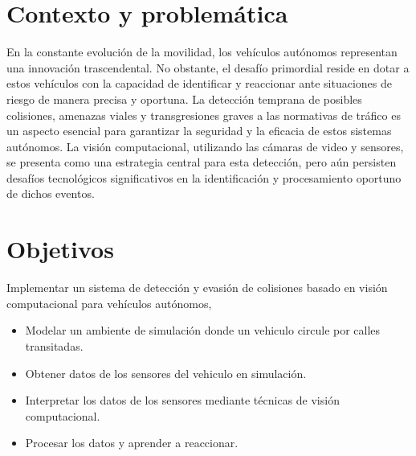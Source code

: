 \documentclass[10pt,letterpaper,final]{article}
\begin{document}
    \section*{Contexto y problemática}
    \noindent En la constante evolución de la movilidad, los vehículos autónomos representan una innovación trascendental.
    No obstante, el desafío primordial reside en dotar a estos vehículos con la capacidad de identificar y reaccionar ante situaciones de riesgo
    de manera precisa y oportuna. La detección temprana de posibles colisiones, amenazas viales y transgresiones graves a las normativas de tráfico
    es un aspecto esencial para garantizar la seguridad y la eficacia de estos sistemas autónomos. La visión computacional,
    utilizando las cámaras de video y sensores, se presenta como una estrategia central para esta detección,
    pero aún persisten desafíos tecnológicos significativos en la identificación y procesamiento oportuno de dichos eventos.
    \section*{Objetivos}
    \newline
    \noindent Implementar un sistema de detección y evasión de colisiones basado en visión computacional para vehículos autónomos,
    \newline
    \newline
    \begin{itemize}
        \item Modelar un ambiente de simulación donde un vehiculo circule por calles transitadas.
        \item Obtener datos de los sensores del vehiculo en simulación.
        \item Interpretar los datos de los sensores mediante técnicas de visión computacional.
        \item Procesar los datos y aprender a reaccionar.
    \end{itemize}
    \clearpage
    
\end{document}

